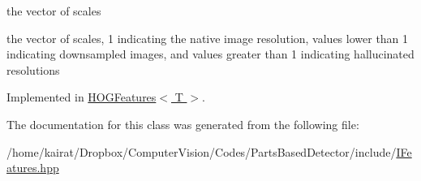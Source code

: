 the vector of scales 

the vector of scales, 1 indicating the native image resolution, values lower than 1 indicating downsampled images, and values greater than 1 indicating hallucinated resolutions 

Implemented in \hyperlink{classHOGFeatures_ad9668fda860881c676e1d1bd70adc18c}{H\+O\+G\+Features$<$ T $>$}.



The documentation for this class was generated from the following file\+:\begin{DoxyCompactItemize}
\item 
/home/kairat/\+Dropbox/\+Computer\+Vision/\+Codes/\+Parts\+Based\+Detector/include/\hyperlink{IFeatures_8hpp}{I\+Features.\+hpp}\end{DoxyCompactItemize}
